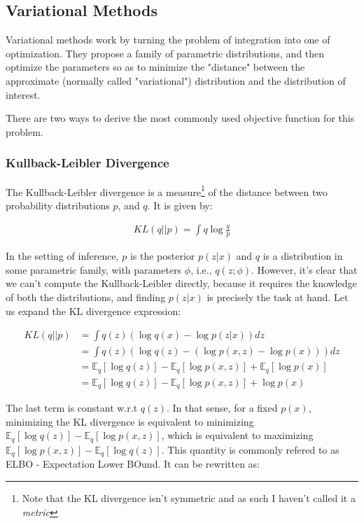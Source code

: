 \subsection{Variational Methods}
\label{subsection:variational}
Variational methods work by turning the problem of integration into one of
optimization. They propose a family of parametric distributions, and then
optimize the parameters so as to minimize the "distance" between the approximate
(normally called "variational") distribution and the distribution of interest.

There are two ways to derive the most commonly used objective function for
this problem.

\subsubsection{Kullback-Leibler Divergence}
\label{subsubsection:kldiv}

The Kullback-Leibler divergence is a measure\footnote{Note that the KL divergence
isn't symmetric and as such I haven't called it a \emph{metric}} of the distance
between two probability distributions $p$, and $q$. It is given by:

\begin{align}
    KL(q||p) = \int q \log\frac{q}{p}
\end{align}

In the setting of inference, $p$ is the posterior $p(z|x)$ and $q$ is a distribution
in some parametric family, with parameters $\phi$, i.e., $q(z; \phi)$. However,
it's clear that we can't compute the Kullback-Leibler directly, because it
requires the knowledge of both the distributions, and finding $p(z|x)$ is precisely
the task at hand. Let us expand the KL divergence expression:

\begin{align}
    KL(q||p) &= \int q(z) (\log q(x) - \log p(z|x)) dz \\
             &= \int q(z) (\log q(z) - (\log p(x, z) - \log p(x))) dz \\
             &= \mathbb{E}_q [\log q(z)] - \mathbb{E}_q [\log p(x, z)] + \mathbb{E}_q [\log p(x)] \\
             &= \mathbb{E}_q [\log q(z)] - \mathbb{E}_q [\log p(x, z)] + \log p(x)
\end{align}

The last term is constant w.r.t $q(z)$. In that sense, for a fixed $p(x)$,
minimizing the KL divergence is equivalent to minimizing
$\mathbb{E}_q [\log q(z)] - \mathbb{E}_q [\log p(x, z)]$, which is equivalent
to maximizing $\mathbb{E}_q [\log p(x, z)] - \mathbb{E}_q [\log q(z)]$. This
quantity is commonly refered to as ELBO - Expectation Lower BOund. It can be
rewritten as:


